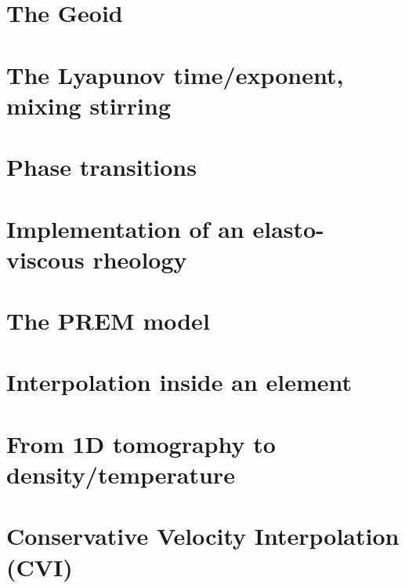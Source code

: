 \section{The Geoid} \label{ss:geoid}  %
\newpage %
\section{The Lyapunov time/exponent, mixing stirring}\label{ss:lyapunov} %
\newpage %
\section{Phase transitions}\label{ss:phasetransitions} %
\newpage %
\section{Implementation of an elasto-viscous rheology} \label{ss:evrheo}  %
\newpage %
\section{The PREM model} \label{ss:prem}  %
\newpage %
\section{Interpolation inside an element} \label{ss:bern}  %
\newpage %
\section{From 1D tomography to density/temperature}  %
\newpage %
\section{Conservative Velocity Interpolation (CVI)} \label{sec:cvi} %
\newpage %
